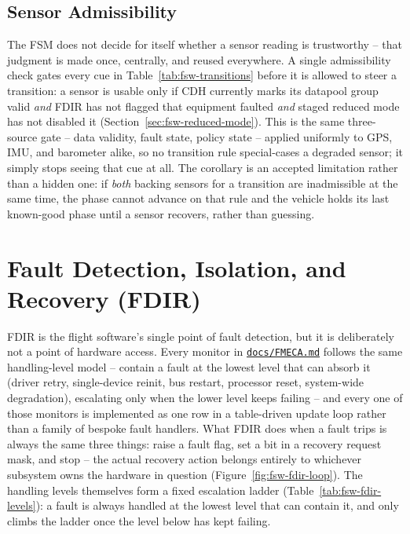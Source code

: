 \subsection{Sensor Admissibility}
\label{sec:fsw-admissibility}

The FSM does not decide for itself whether a sensor reading is trustworthy
-- that judgment is made once, centrally, and reused everywhere. A single
admissibility check gates every cue in Table~\ref{tab:fsw-transitions}
before it is allowed to steer a transition: a sensor is usable only if CDH
currently marks its datapool group valid \emph{and} FDIR has not flagged
that equipment faulted \emph{and} staged reduced mode has not disabled it
(Section~\ref{sec:fsw-reduced-mode}). This is the same three-source
gate -- data validity, fault state, policy state -- applied uniformly to
GPS, IMU, and barometer alike, so no transition rule special-cases a
degraded sensor; it simply stops seeing that cue at all. The corollary is
an accepted limitation rather than a hidden one: if \emph{both} backing
sensors for a transition are inadmissible at the same time, the phase
cannot advance on that rule and the vehicle holds its last known-good
phase until a sensor recovers, rather than guessing.

\section{Fault Detection, Isolation, and Recovery (FDIR)}
\label{sec:fsw-fdir}

FDIR is the flight software's single point of fault detection, but it is
deliberately not a point of hardware access. Every monitor in
\href{\repourl/blob/main/firmware-stm32/docs/FMECA.md}{\texttt{docs/FMECA.md}} follows the same handling-level model -- contain a
fault at the lowest level that can absorb it (driver retry, single-device
reinit, bus restart, processor reset, system-wide degradation), escalating
only when the lower level keeps failing -- and every one of those monitors
is implemented as one row in a table-driven update loop rather than a
family of bespoke fault handlers. What FDIR does when a fault trips is
always the same three things: raise a fault flag, set a bit in a recovery
request mask, and stop -- the actual recovery action belongs entirely to
whichever subsystem owns the hardware in question (Figure~\ref{fig:fsw-fdir-loop}).
The handling levels themselves form a fixed escalation ladder
(Table~\ref{tab:fsw-fdir-levels}): a fault is always handled at the lowest
level that can contain it, and only climbs the ladder once the level below
has kept failing.

